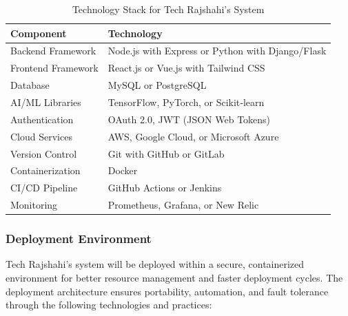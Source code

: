 \documentclass[12pt,a4paper]{article}
\begin{document}
\begin{table}[H]
    \centering
    \renewcommand{\arraystretch}{1.3}
    \begin{tabular}{|p{4cm}|p{10cm}|}
        \hline
        \textbf{Component} & \textbf{Technology} \\
        \hline
        Backend Framework & Node.js with Express or Python with Django/Flask \\
        \hline
        Frontend Framework & React.js or Vue.js with Tailwind CSS \\
        \hline
        Database & MySQL or PostgreSQL \\
        \hline
        AI/ML Libraries & TensorFlow, PyTorch, or Scikit‑learn \\
        \hline
        Authentication & OAuth 2.0, JWT (JSON Web Tokens) \\
        \hline
        Cloud Services & AWS, Google Cloud, or Microsoft Azure \\
        \hline
        Version Control & Git with GitHub or GitLab \\
        \hline
        Containerization & Docker \\
        \hline
        CI/CD Pipeline & GitHub Actions or Jenkins \\
        \hline
        Monitoring & Prometheus, Grafana, or New Relic \\
        \hline
    \end{tabular}
    \caption{Technology Stack for Tech Rajshahi's System}
    \label{tab:tech_stack}
\end{table}

\subsubsection{Deployment Environment}
Tech Rajshahi's system will be deployed within a secure, containerized environment for better resource management and faster deployment cycles.  The deployment architecture ensures portability, automation, and fault tolerance through the following technologies and practices:
\end{document}

